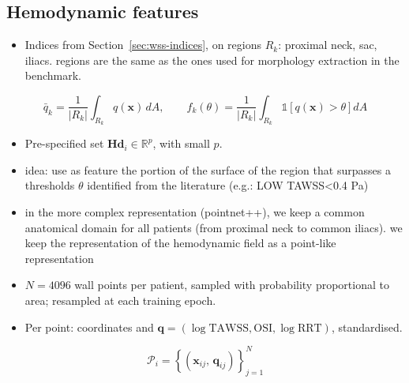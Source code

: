 \subsection{Hemodynamic features}
\begin{itemize}
    \item Indices from Section~\ref{sec:wss-indices}, on regions $R_k$: proximal neck, sac, iliacs. regions are the same as the ones used for morphology extraction in the benchmark. 
\end{itemize}
\begin{equation}
    \bar{q}_{k} = \frac{1}{|R_k|}\int_{R_k} q(\mathbf{x})\,dA,
    \qquad
    f_{k}(\theta) = \frac{1}{|R_k|}\int_{R_k} \mathbb{1}\left[q(\mathbf{x}) > \theta\right] dA
\end{equation}
\begin{itemize}
    \item Pre-specified set $\mathbf{Hd}_i \in \mathbb{R}^p$, with small $p$. 
    \item idea: use as feature the portion of the surface of the region that surpasses a thresholds $\theta$ identified from the literature (e.g.: LOW TAWSS<0.4 Pa)

    \item in the more complex representation (pointnet++), we keep a common anatomical domain for all patients (from proximal neck to common iliacs). we keep the representation of the hemodynamic field as a point-like representation
    \item $N = 4096$ wall points per patient, sampled with probability proportional to area; resampled at each training epoch.
    \item Per point: coordinates and $\mathbf{q} = (\log\mathrm{TAWSS}, \mathrm{OSI}, \log\mathrm{RRT})$, standardised.
\end{itemize}
\begin{equation}
    \mathcal{P}_i = \left\{ \left(\mathbf{x}_{ij},\, \mathbf{q}_{ij}\right) \right\}_{j=1}^{N}
\end{equation}

